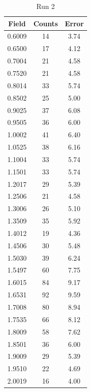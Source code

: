 \begin{table}
\caption{Run 2}
\begin{tabular}{|c|c|c|} \hline
Field	&	Counts	&	Error	\\ \hline
0.6009	&	14	&	3.74	\\ \hline
0.6500	&	17	&	4.12	\\ \hline
0.7004	&	21	&	4.58	\\ \hline
0.7520	&	21	&	4.58	\\ \hline
0.8014	&	33	&	5.74	\\ \hline
0.8502	&	25	&	5.00	\\ \hline
0.9025	&	37	&	6.08	\\ \hline
0.9505	&	36	&	6.00	\\ \hline
1.0002	&	41	&	6.40	\\ \hline
1.0525	&	38	&	6.16	\\ \hline
1.1004	&	33	&	5.74	\\ \hline
1.1501	&	33	&	5.74	\\ \hline
1.2017	&	29	&	5.39	\\ \hline
1.2506	&	21	&	4.58	\\ \hline
1.3006	&	26	&	5.10	\\ \hline
1.3509	&	35	&	5.92	\\ \hline
1.4012	&	19	&	4.36	\\ \hline
1.4506	&	30	&	5.48	\\ \hline
1.5030	&	39	&	6.24	\\ \hline
1.5497	&	60	&	7.75	\\ \hline
1.6015	&	84	&	9.17	\\ \hline
1.6531	&	92	&	9.59	\\ \hline
1.7008	&	80	&	8.94	\\ \hline
1.7535	&	66	&	8.12	\\ \hline
1.8009	&	58	&	7.62	\\ \hline
1.8501	&	36	&	6.00	\\ \hline
1.9009	&	29	&	5.39	\\ \hline
1.9510	&	22	&	4.69	\\ \hline
2.0019	&	16	&	4.00	\\ \hline
\end{tabular}
\end{table}
